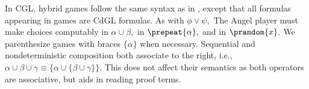 \documentclass[12pt]{cmuthesis}
\theoremstyle{definition}
\newtheorem{definition}{Definition}
\theoremstyle{remark}
\newcommand{\bebecomes}{\mathrel{::=}}
\newcommand{\alternative}{~|~}
\newcommand{\CGL}{\textsf{CGL}\xspace}
\newcommand{\CdGL}{\textsf{CdGL}\xspace}
\begin{document}
In \CGL, hybrid games follow the same syntax as in \dGL, except that all formulas appearing in games are \CdGL formulas.
As with $\phi \lor \psi,$ The Angel player must make choices computably in $\alpha \cup \beta,$ in $\prepeat{\alpha},$ and in $\prandom{x}$.
We parenthesize games with braces $\{ \alpha \}$ when necessary.
Sequential and nondeterministic composition both associate to the right, i.e., $\alpha \cup \beta \cup \gamma \equiv \{\alpha \cup \{\beta \cup \gamma\}\}$.
This does not affect their semantics as both operators are associative, but aids in reading proof terms.

\end{document}
